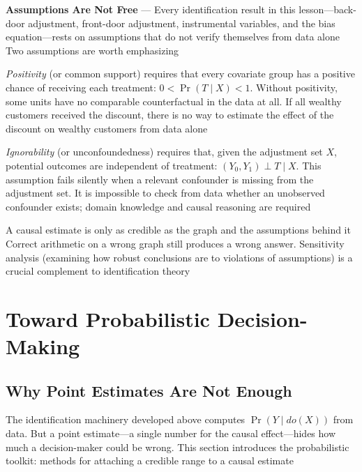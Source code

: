 \textbf{Assumptions Are Not Free} --- Every identification result in this
lesson—back-door adjustment, front-door adjustment, instrumental variables, and the
bias equation—rests on assumptions that do not verify themselves from data alone
Two assumptions are worth emphasizing

\emph{Positivity} (or common support) requires that every covariate group has a
positive chance of receiving each treatment: $0 < \Pr(T \mid X) < 1$. Without
positivity, some units have no comparable counterfactual in the data at all. If
all wealthy customers received the discount, there is no way to estimate the effect
of the discount on wealthy customers from data alone

\emph{Ignorability} (or unconfoundedness) requires that, given the adjustment
set $X$, potential outcomes are independent of treatment:
$(Y_{0}, Y_{1}) \perp T \mid X$. This assumption fails silently when a relevant confounder
is missing from the adjustment set. It is impossible to check from data whether
an unobserved confounder exists; domain knowledge and causal reasoning are required

A causal estimate is only as credible as the graph and the assumptions behind it
Correct arithmetic on a wrong graph still produces a wrong answer. Sensitivity analysis
(examining how robust conclusions are to violations of assumptions) is a crucial
complement to identification theory

\section{Toward Probabilistic Decision-Making}
\label{sec:toward-probabilistic-decision-making}

\subsection{Why Point Estimates Are Not Enough}
\label{subsec:why-point-estimates-are-not-enough}

The identification machinery developed above computes $\Pr(Y \mid do(X))$ from
data. But a point estimate—a single number for the causal effect—hides how much a
decision-maker could be wrong. This section introduces the probabilistic toolkit:
methods for attaching a credible range to a causal estimate

